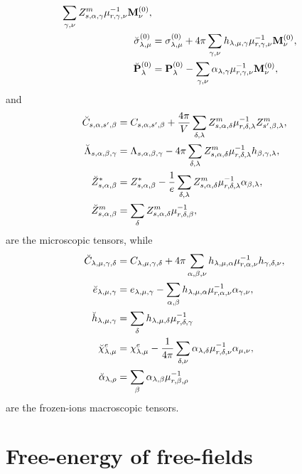 \documentclass[12pt,a4paper,twoside]{report}
\begin{document}
{\begin{align}
\sum_{\gamma,\nu}
Z^m_{s,\alpha,\gamma} \mu^{-1}_{r,\gamma,\nu} {\bf M}^{(0)}_\nu, \\
\breve \sigma^{(0)}_{\lambda,\mu}&= \sigma^{(0)}_{\lambda,\mu}
+ 4 \pi \sum_{\gamma,\nu} h_{\lambda,\mu,\gamma} \mu^{-1}_{r,\gamma,\nu} 
{\bf M}^{(0)}_\nu, \\
\breve {\bf P}^{(0)}_\lambda&= {\bf P}^{(0)}_\lambda -
\sum_{\gamma,\nu} \alpha_{\lambda,\gamma} \mu^{-1}_{r,\gamma,\nu} 
{\bf M}^{(0)}_\nu, \\
\end{align}
and
\begin{align}
\breve C_{s,\alpha,s',\beta} &= C_{s,\alpha,s',\beta}+
{4 \pi \over V}  \sum_{\delta,\lambda} Z^m_{s,\alpha,\delta}
\mu^{-1}_{r,\delta,\lambda}Z^m_{s',\beta,\lambda},\\
\breve \Lambda_{s,\alpha,\beta,\gamma} &= \Lambda_{s,\alpha,\beta,\gamma}
- 4 \pi \sum_{\delta,\lambda} Z^m_{s,\alpha,\delta}
\mu^{-1}_{r,\delta,\lambda} h_{\beta,\gamma,\lambda}, \\
\breve Z^*_{s,\alpha,\beta} &= Z^*_{s,\alpha,\beta}
-{1\over e} \sum_{\delta,\lambda} Z^m_{s,\alpha,\delta} 
\mu^{-1}_{r,\delta,\lambda} \alpha_{\beta,\lambda}, \\
\breve Z^m_{s,\alpha,\beta} &= \sum_{\delta} Z^m_{s,\alpha,\delta} 
\mu^{-1}_{r,\delta,\beta}, 
\end{align}
are the microscopic tensors, while
\begin{align}
\breve C_{\lambda,\mu,\gamma,\delta} &=
C_{\lambda,\mu,\gamma,\delta} + 4 \pi \sum_{\alpha,\beta,\nu}
h_{\lambda,\mu,\alpha} \mu^{-1}_{r,\alpha,\nu} 
h_{\gamma,\delta,\nu}, \\
\breve e_{\lambda,\mu,\gamma}&= e_{\lambda,\mu,\gamma}
-\sum_{\alpha,\beta} h_{\lambda,\mu,\alpha} \mu^{-1}_{r,\alpha,\nu}
\alpha_{\gamma,\nu}, \\
\breve h_{\lambda,\mu,\gamma}&= \sum_\delta h_{\lambda,\mu,\delta}
\mu^{-1}_{r,\delta,\gamma} \\
\breve \chi^e_{\lambda,\mu}&= \chi^e_{\lambda,\mu}
-{1\over 4 \pi} \sum_{\delta,\nu} \alpha_{\lambda,\delta} 
\mu^{-1}_{r,\delta,\nu} \alpha_{\mu,\nu}, \\
\breve \alpha_{\lambda,\rho} &= \sum_\beta \alpha_{\lambda,\beta}
\mu^{-1}_{r,\beta,\rho}
\end{align}
are the frozen-ions macroscopic tensors.
}

\newpage
{\color{dark-blue}\chapter{Free-energy of free-fields}}
\color{black}
\end{document}
